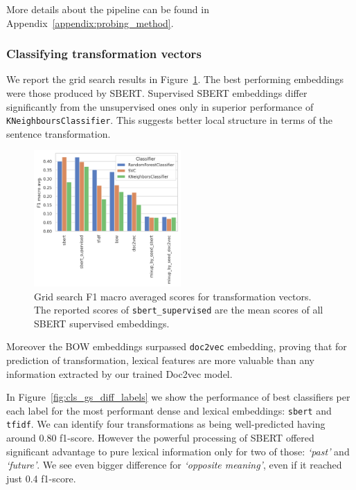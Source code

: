 \documentclass[11pt]{article}
\newcommand{\Embed}[1]{\texttt{#1}}
\newcommand{\Cls}[1]{\texttt{#1}}
\newcommand{\Trans}[1]{\textsl{`#1'}}
\begin{document}
More details about the pipeline can be found in
Appendix~\ref{appendix:probing_method}.

\subsubsection{Classifying transformation vectors}

We report the grid search results in
Figure~\ref{fig:cls_gs_diff_embed_comparison}. The best performing embeddings
were those produced by SBERT\@. Supervised SBERT embeddings differ
significantly from the unsupervised ones only in superior performance of
\Cls{KNeighboursClassifier}. This suggests better local structure in terms of
the sentence transformation.

\begin{figure}[htp]
  \centering
  \includegraphics[width=0.5\textwidth]{figs/cls_gs_diff_embed_comparison.png}

  \caption{Grid search F1 macro averaged scores for transformation vectors.
  The reported scores of \Embed{sbert\_supervised} are the mean scores of all
  SBERT supervised embeddings.
  }\label{fig:cls_gs_diff_embed_comparison}

\end{figure}

Moreover the BOW embeddings surpassed \Embed{doc2vec} embedding,
proving that for prediction of transformation, lexical features are more
valuable than any information extracted by our trained Doc2vec model.


In Figure~\ref{fig:cls_gs_diff_labels} we show the performance of best
classifiers per each label for the most performant dense and lexical
embeddings: \Embed{sbert} and \Embed{tfidf}. We can identify four
transformations as being well-predicted having around 0.80 f1-score. However
the powerful processing of SBERT offered significant advantage to pure lexical
information only for two of those: \Trans{past} and \Trans{future}. We see even
bigger difference for \Trans{opposite meaning}, even if it reached just 0.4
f1-score.
\end{document}

